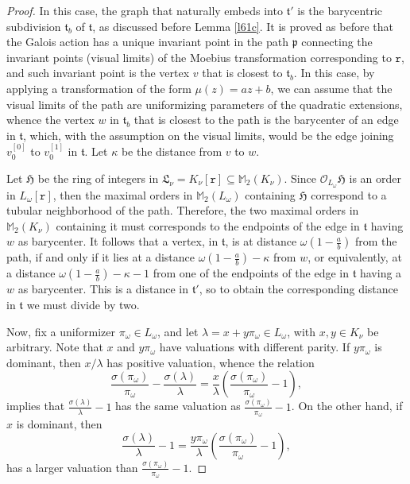 \documentclass{article}
\theoremstyle{definition}
\theoremstyle{remark}
\begin{document}
\begin{proof}
    In this case, the graph that naturally embeds into 
    $\mathfrak{t}'$ is the barycentric subdivision 
    $\mathfrak{t}_b$ of $\mathfrak{t}$, as discussed
    before Lemma \ref{l61c}. It is proved
    as before that the Galois action has a unique invariant
    point in the path $\mathfrak{p}$ connecting the 
    invariant points (visual limits) of
    the Moebius transformation corresponding to
    $\mathtt{r}$, and such invariant
    point is the vertex $v$ that is closest
    to $\mathfrak{t}_b$. In this case, by applying
    a transformation of the form $\mu(z)=az+b$, 
    we can assume that the 
    visual limits of the path are uniformizing parameters 
    of the quadratic extensions, whence the vertex $w$ 
    in $\mathfrak{t}_b$
    that is closest to the path is the barycenter
    of an edge in $\mathfrak{t}$, which, with the 
    assumption on the visual limits, would be the
    edge joining $v_0^{[0]}$ to $v_0^{[1]}$ in
    $\mathfrak{t}$.
    Let $\kappa$ be the distance from $v$ to $w$.

    Let $\mathfrak{H}$ be the ring of integers in 
    $\mathfrak{L}_\nu=K_\nu[\mathtt{r}]
    \subseteq\mathbb{M}_2(K_\nu)$.
    Since $\mathcal{O}_{L_\omega}\mathfrak{H}$ is an order 
    in $L_\omega[\mathtt{r}]$,
    then the maximal orders in 
    $\mathbb{M}_2(L_\omega)$ containing
    $\mathfrak{H}$ correspond to a tubular neighborhood of the 
    path. Therefore, the two maximal orders in 
    $\mathbb{M}_2(K_\nu)$ containing it
    must corresponds to the endpoints of the edge in 
    $\mathfrak{t}$ having $w$ as barycenter. It follows
    that a vertex, in $\mathfrak{t}$, is at distance 
     $\omega\left(1-\frac ab\right)$ from the path,
     if and only if it lies at a distance 
     $\omega\left(1-\frac ab\right)-\kappa$ from $w$, or 
     equivalently,  at a distance 
     $\omega\left(1-\frac ab\right)-\kappa-1$ from one
     of the endpoints of the edge in 
    $\mathfrak{t}$ having a $w$ as barycenter. 
    This is a distance
    in  $\mathfrak{t}'$, so to obtain the corresponding
    distance in  $\mathfrak{t}$ we must divide by two.
    
    Now, fix a uniformizer $\pi_\omega\in L_\omega$, and
    let $\lambda=x+y\pi_\omega\in L_\omega$, 
    with $x,y\in K_\nu$ 
    be arbitrary. Note that $x$ and  
    $y\pi_\omega$ have valuations
    with different parity. If $y\pi_\omega$
    is dominant, then $x/\lambda$
    has positive valuation, whence the relation
    $$\frac{\sigma(\pi_\omega)}{\pi_\omega}-
    \frac{\sigma(\lambda)}{\lambda}=\frac x{\lambda}
    \left(\frac{\sigma(\pi_\omega)}{\pi_\omega}-1\right),$$
    implies that $\frac{\sigma(\lambda)}{\lambda}-1$ 
    has the same 
    valuation as $\frac{\sigma(\pi_\omega)}{\pi_\omega}-1$.
    On the other hand, if $x$ is dominant, then
    $$\frac{\sigma(\lambda)}{\lambda}-1=
    \frac {y\pi_\omega}{\lambda}
    \left(\frac{\sigma(\pi_\omega)}{\pi_\omega}-1\right),$$
    has a larger valuation than 
    $\frac{\sigma(\pi_\omega)}{\pi_\omega}-1$.


\end{proof}
\end{document}
